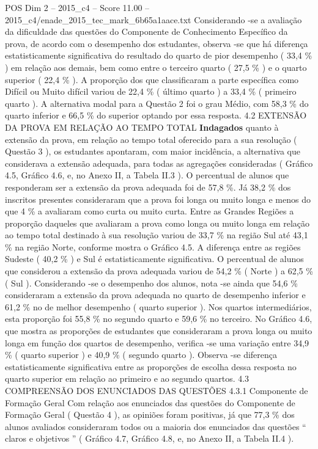 \begin{textsample}{POS Dim 2 – 2015\_c4 – Score 11.00 – 2015\_c4/enade\_2015\_tec\_mark\_6b65a1aace.txt}
Considerando -se a avaliação da dificuldade das questões do Componente de Conhecimento Específico da prova, de acordo com o desempenho dos estudantes, observa -se que há diferença estatisticamente significativa do resultado do quarto de pior desempenho ( 33,4 \% ) em relação aos demais, bem como entre o terceiro quarto ( 27,5 \% ) e o quarto superior ( 22,4 \% ).
A proporção dos que classificaram a parte específica como Difícil ou Muito difícil variou de 22,4 \% ( último quarto ) a 33,4 \% ( primeiro quarto ).
A alternativa modal para a Questão 2 foi o grau Médio, com 58,3 \% do quarto inferior e 66,5 \% do superior optando por essa resposta. 4.2 EXTENSÃO DA PROVA EM RELAÇÃO AO TEMPO TOTAL \textbf{Indagados} quanto à extensão da prova, em relação ao tempo total oferecido para a sua resolução ( Questão 3 ), os estudantes apontaram, com maior incidência, a alternativa que considerava a extensão adequada, para todas as agregações consideradas ( Gráfico 4.5, Gráfico 4.6, e, no Anexo II, a Tabela II.3 ).
O percentual de alunos que responderam ser a extensão da prova adequada foi de 57,8 \%.
Já 38,2 \% dos inscritos presentes consideraram que a prova foi longa ou muito longa e menos do que 4 \% a avaliaram como curta ou muito curta.
Entre as Grandes Regiões a proporção daqueles que avaliaram a prova como longa ou muito longa em relação ao tempo total destinado à sua resolução variou de 33,7 \% na região Sul até 43,1 \% na região Norte, conforme mostra o Gráfico 4.5.
A diferença entre as regiões Sudeste ( 40,2 \% ) e Sul é estatisticamente significativa.
O percentual de alunos que considerou a extensão da prova adequada variou de 54,2 \% ( Norte ) a 62,5 \% ( Sul ).
Considerando -se o desempenho dos alunos, nota -se ainda que 54,6 \% consideraram a extensão da prova adequada no quarto de desempenho inferior e 61,2 \% no de melhor desempenho ( quarto superior ).
Nos quartos intermediários, esta proporção foi 55,8 \% no segundo quarto e 59,6 \% no terceiro.
No Gráfico 4.6, que mostra as proporções de estudantes que consideraram a prova longa ou muito longa em função dos quartos de desempenho, verifica -se uma variação entre 34,9 \% ( quarto superior ) e 40,9 \% ( segundo quarto ).
Observa -se diferença estatisticamente significativa entre as proporções de escolha dessa resposta no quarto superior em relação ao primeiro e ao segundo quartos. 4.3 COMPREENSÃO DOS ENUNCIADOS DAS QUESTÕES 4.3.1 Componente de Formação Geral Com relação aos enunciados das questões do Componente de Formação Geral ( Questão 4 ), as opiniões foram positivas, já que 77,3 \% dos alunos avaliados consideraram todos ou a maioria dos enunciados das questões “ claros e objetivos ” ( Gráfico 4.7, Gráfico 4.8, e, no Anexo II, a Tabela II.4 ).

\end{textsample}
